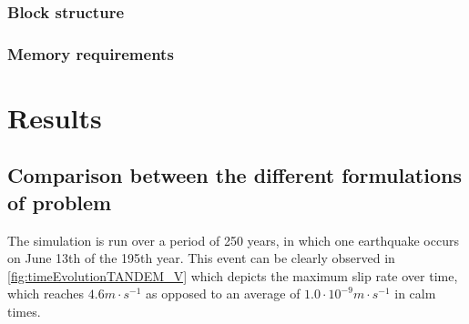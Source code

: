 \subsubsection{Block structure}
\subsubsection{Memory requirements}

\section{Results}
\subsection{Comparison between the different formulations of problem}
The simulation is run over a period of 250 years, in which one earthquake occurs on June 13th of the 195th year. This event can be clearly observed in \autoref{fig:timeEvolutionTANDEM_V} which depicts the maximum slip rate over time, which reaches $4.6m\cdot s^{-1}$ as opposed to an average of $1.0 \cdot 10^{-9}m\cdot s^{-1}$ in calm times. 
